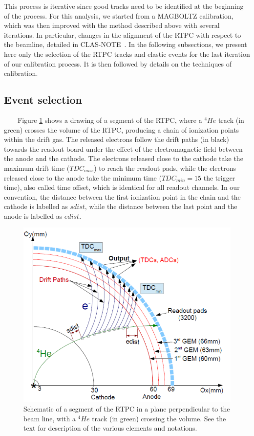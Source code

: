 This process is iterative since good tracks need to be identified at the beginning of the process. For this analysis, we started from a MAGBOLTZ calibration, which was then improved with the method described above with several iterations. In particular, changes in the alignment of the RTPC with respect to the beamline, detailed in CLAS-NOTE~\cite{eg6beamoffset}. In the following subsections, we present here only the selection of the RTPC tracks and elastic events for the last iteration of our calibration process. It is then followed by details on the techniques of calibration.   

\subsection{Event selection}
~~~~Figure \ref{fig:RTPC_track} shows a drawing of a segment of the RTPC, where a $^4He$ track (in 
green) crosses the volume of the RTPC, producing a chain of ionization points 
within the drift gas. The released electrons follow the drift paths (in black) 
towards the readout board under the effect of the  electromagnetic field 
between the anode and the cathode. The electrons released close to the cathode 
take the maximum drift time ($TDC_{max}$) to reach the readout pads, while the 
electrons released close to the anode take the minimum time ($TDC_{min} = 15$ the 
trigger time), also called time offset, which is identical 
for all readout channels. In our convention, the distance between the 
first ionization point in the chain and the cathode is labelled as $sdist$, 
while the distance between the last point and the anode is labelled as 
$edist$.\\ 

\begin{figure}[tbp]
\centering
\vspace{-0.1in}
\includegraphics[scale=0.38]{fig_rtpc/RTPC_track.png}
\vspace{-0.1in}
\caption{Schematic of a segment of the RTPC in a plane perpendicular to the beam line, with a $^4He$ track (in green) crossing the volume. See the text for description of the various elements and notations.} 
\label{fig:RTPC_track}
\end{figure}

